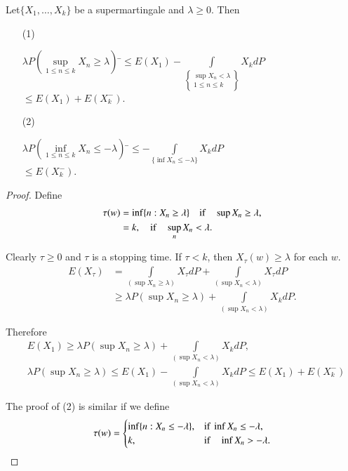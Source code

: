 \begin{theorem*}
Let\pageoriginale $\{X_{1},\ldots,X_{k}\}$ be a supermartingale and
$\lambda\geq 0$. Then
\begin{itemize}
\item[\rm(1)] \begin{tabbing}
$\lambda P(\sup\limits_{1\leq n\leq k}X_{n}\geq \lambda)$ \=$\leq
  E(X_{1})-\int\limits_{\left\{\substack{\sup X_{n}<\lambda\\ 1\leq
      n\leq k}\right\}}X_{k}dP$\\[7pt]
\>$\leq E(X_{1})+E(X^{-}_{k})$. 
\end{tabbing}

\item[\rm(2)] \begin{tabbing}
$\lambda P(\inf\limits_{1\leq n\leq k}X_{n}\leq -\lambda)$ \=$\leq
  -\int\limits_{\{\inf X_{n}\leq -\lambda\}}X_{k}dP$\\[5pt]
\>$\leq E(X^{-}_{k})$.
\end{tabbing}
\end{itemize}
\end{theorem*}

\begin{proof}
Define 
\begin{align*}
\tau(w) &=\inf\{n:X_{n}\geq \lambda\}\quad\text{if}\quad\sup X_{n}\geq
\lambda,\\
& =k,\quad\text{if}\quad \sup\limits_{n}X_{n}<\lambda.
\end{align*}

Clearly $\tau\geq 0$ and $\tau$ is a stopping time. If $\tau<k$, then
$X_{\tau}(w)\geq\lambda$ for each $w$.
\begin{align*}
E(X_{\tau}) &= \int\limits_{(\sup X_{n}\geq
  \lambda)}X_{\tau}dP+\int\limits_{(\sup X_{n}<\lambda)}X_{\tau}dP\\
&\geq \lambda P(\sup X_{n}\geq \lambda)+\int\limits_{(\sup
  X_{n}<\lambda)}X_{k}dP.  
\end{align*}

Therefore
\begin{align*}
& E(X_{1})\geq \lambda P(\sup X_{n}\geq \lambda)+\int\limits_{(\sup
    X_{n}<\lambda)}X_{k}dP,\\ 
&\lambda P(\sup X_{n}\geq \lambda)\leq E(X_{1})-\int\limits_{(\sup
    X_{n}<\lambda)}X_{k}dP\leq E(X_{1})+E(X^{-}_{k})
\end{align*}

The proof of (2) is similar if we define
$$
\tau(w)=
\begin{cases}
\inf \{n:X_{n}\leq -\lambda\}, &\text{if~ } \inf X_{n}\leq -\lambda,\\
k, & \text{if}\quad \inf X_{n}>-\lambda.
\end{cases}
$$
\end{proof}

